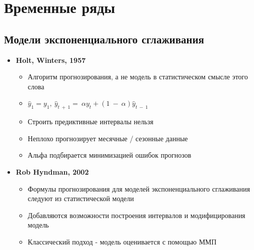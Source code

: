 \documentclass[a4paper, 12pt]{article}
\begin{document}
\section{Временные ряды}

\subsection{Модели экспоненциального сглаживания}

\begin{itemize}
\item \textbf{Holt, Winters, 1957}

  \begin{itemize}
  \item
    
    Алгоритм прогнозирования, а не модель в статистическом смысле этого
    слова
    
  \item
    
    \({\widehat{y}}_{1} = y_{1},\ {\widehat{y}}_{t\  + \ 1} = \ \alpha y_{t} + (1\  - \ \alpha){\widehat{y}}_{t\  - \ 1}\)
    
  \item
    
    Строить предиктивные интервалы нельзя
    
  \item
    
    Неплохо прогнозирует месячные / сезонные данные
    
  \item
    
    Альфа подбирается минимизацией ошибок прогнозов
    
  \end{itemize}
\item \textbf{Rob Hyndman, 2002}

  \begin{itemize}
  \item
    
    Формулы прогнозирования для моделей экспоненциального сглаживания
    следуют из статистической модели
    
  \item
    
    Добавляются возможности построения интервалов и модифицирования
    модель
    
  \item
    
    Классический подход - модель оценивается с помощью ММП
    

\end{itemize}
\end{itemize}
\end{document}
